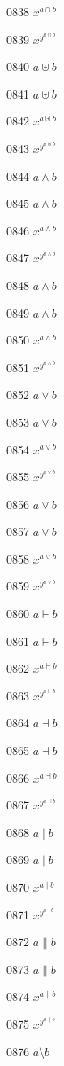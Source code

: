 \documentclass{article}
\begin{document}
0838 $x^{a\cap b}$\par
0839 $x^{y^{a\cap b}}$\par
0840 $a\uplus b$\par
0841 $\displaystyle a\uplus b$\par
0842 $x^{a\uplus b}$\par
0843 $x^{y^{a\uplus b}}$\par
0844 $a\land b$\par
0845 $\displaystyle a\land b$\par
0846 $x^{a\land b}$\par
0847 $x^{y^{a\land b}}$\par
0848 $a\wedge b$\par
0849 $\displaystyle a\wedge b$\par
0850 $x^{a\wedge b}$\par
0851 $x^{y^{a\wedge b}}$\par
0852 $a\lor b$\par
0853 $\displaystyle a\lor b$\par
0854 $x^{a\lor b}$\par
0855 $x^{y^{a\lor b}}$\par
0856 $a\vee b$\par
0857 $\displaystyle a\vee b$\par
0858 $x^{a\vee b}$\par
0859 $x^{y^{a\vee b}}$\par
0860 $a\vdash b$\par
0861 $\displaystyle a\vdash b$\par
0862 $x^{a\vdash b}$\par
0863 $x^{y^{a\vdash b}}$\par
0864 $a\dashv b$\par
0865 $\displaystyle a\dashv b$\par
0866 $x^{a\dashv b}$\par
0867 $x^{y^{a\dashv b}}$\par
0868 $a\mid b$\par
0869 $\displaystyle a\mid b$\par
0870 $x^{a\mid b}$\par
0871 $x^{y^{a\mid b}}$\par
0872 $a\parallel b$\par
0873 $\displaystyle a\parallel b$\par
0874 $x^{a\parallel b}$\par
0875 $x^{y^{a\parallel b}}$\par
0876 $a\setminus b$\par
\end{document}
